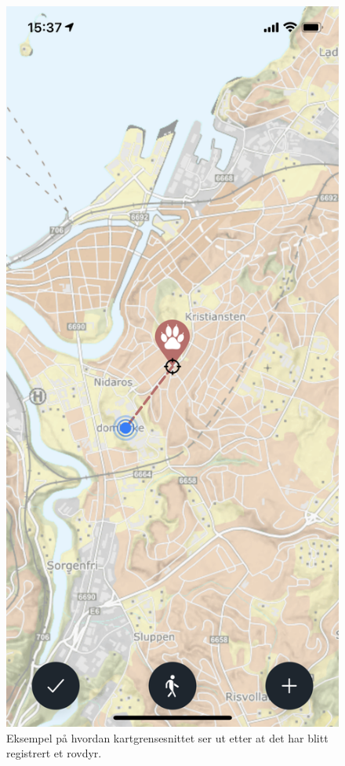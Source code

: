 \begin{figure}[H]
\centering
\captionsetup{width=.8\linewidth}
\includegraphics[scale=0.4]{Figurer/skjermbilder/registert-rovdyr.png}
\caption{Eksempel på hvordan kartgrensesnittet ser ut etter at det har blitt registrert et rovdyr.}
\label{fig:registrert-rovdyr}
\end{figure}

